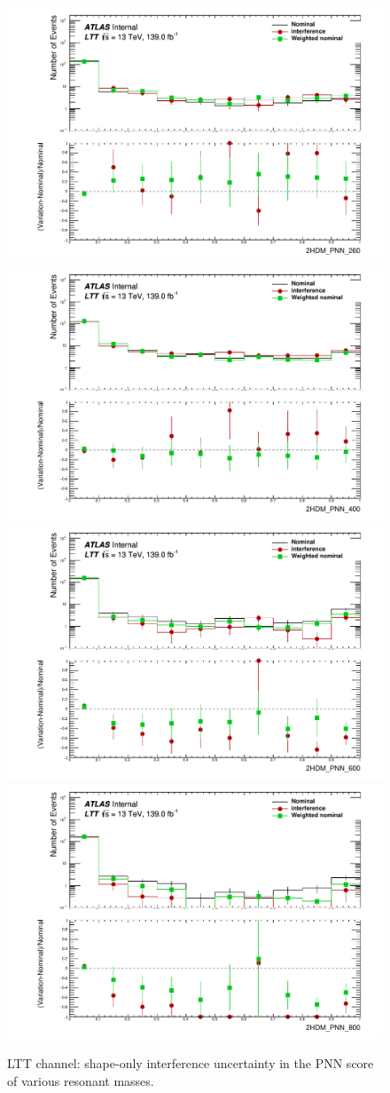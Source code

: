 \begin{figure}
      \centering
\includegraphics[width=.45\textwidth]{figures/lephad_modelling_systs/LTT/singletop/interference/Hist_and_ratio_2HDM_PNN_260_Norm}   
\includegraphics[width=.45\textwidth]{figures/lephad_modelling_systs/LTT/singletop/interference/Hist_and_ratio_2HDM_PNN_400_Norm}   \\ 
\includegraphics[width=.45\textwidth]{figures/lephad_modelling_systs/LTT/singletop/interference/Hist_and_ratio_2HDM_PNN_600_Norm}   
\includegraphics[width=.45\textwidth]{figures/lephad_modelling_systs/LTT/singletop/interference/Hist_and_ratio_2HDM_PNN_800_Norm}  \\  
\caption{LTT channel: shape-only interference uncertainty in the PNN score of various resonant masses.}
\label{fig:singletopsyst_lephad_interference_PNN_LTT}
\end{figure}



